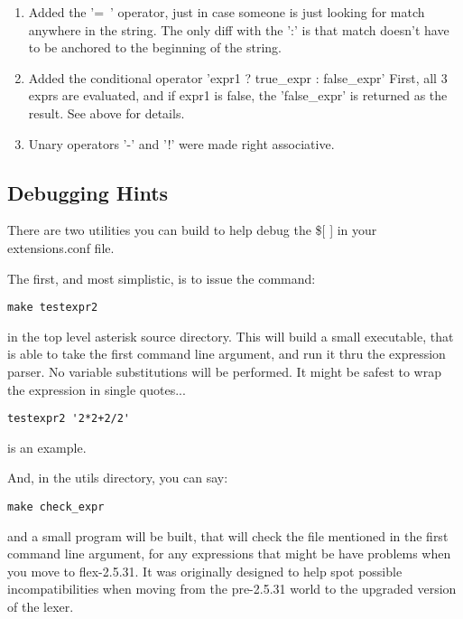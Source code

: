\begin{enumerate}
\item  Added the '=~' operator, just in case someone is just looking for
    match anywhere in the string. The only diff with the ':' is that
    match doesn't have to be anchored to the beginning of the string.

\item  Added the conditional operator  'expr1 ? true\_expr : false\_expr'
    First, all 3 exprs are evaluated, and if expr1 is false, the 'false\_expr'
    is returned as the result. See above for details.

\item  Unary operators '-' and '!' were made right associative.
\end{enumerate}

\subsection{Debugging Hints}

There are two utilities you can build to help debug the \$[ ] in
your extensions.conf file.

The first, and most simplistic, is to issue the command:
\begin{astlisting}
\begin{verbatim}
make testexpr2
\end{verbatim}
\end{astlisting}
in the top level asterisk source directory. This will build a small
executable, that is able to take the first command line argument, and
run it thru the expression parser. No variable substitutions will be
performed. It might be safest to wrap the expression in single
quotes...
\begin{astlisting}
\begin{verbatim}
testexpr2 '2*2+2/2'
\end{verbatim}
\end{astlisting}
is an example.

And, in the utils directory, you can say:
\begin{astlisting}
\begin{verbatim}
make check_expr
\end{verbatim}
\end{astlisting}
and a small program will be built, that will check the file mentioned
in the first command line argument, for any expressions that might be
have problems when you move to flex-2.5.31.  It was originally
designed to help spot possible incompatibilities when moving from the
pre-2.5.31 world to the upgraded version of the lexer.


